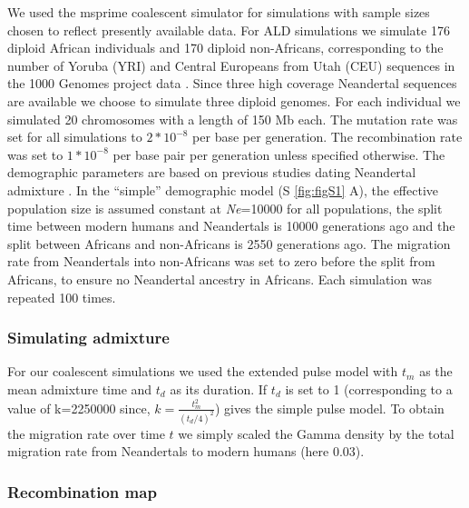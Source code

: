 \documentclass[]{article}
\begin{document}
We used the msprime coalescent simulator
\citep{kelleher_efficient_2016} for simulations with sample sizes
chosen to reflect presently available data. For ALD simulations we simulate 176 diploid
African individuals and 170 diploid non-Africans, corresponding to the
number of Yoruba (YRI) and Central Europeans from Utah (CEU)
sequences in the 1000 Genomes project data \citep{the_1000_genomes_project_consortium_global_2015}. Since three
high coverage Neandertal sequences are available \citep{prufer_complete_2013,prufer_high-coverage_2017,mafessoni_high_coverage_2020} we choose to
simulate three diploid genomes. For each individual we simulated 20
chromosomes with a length of 150 Mb each. The mutation rate was set for
all simulations to \(2*10^{-8}\) per base per generation. The
recombination rate was set to \(1*10^{-8}\) per base pair per generation
unless specified otherwise. The demographic parameters are based on
previous studies dating Neandertal admixture
\citep{sankararaman_date_2012,fu_genome_2014,moorjani_genetic_2016}. In
the ``simple'' demographic model (S \ref{fig:figS1} A), the effective
population size is assumed constant at \textit{Ne}=10000 for all populations, the
split time between modern humans and Neandertals is 10000 generations
ago and the split between Africans and non-Africans is 2550
generations ago. The migration rate from Neandertals into non-Africans
was set to zero before the split from Africans, to ensure no Neandertal
ancestry in Africans. Each simulation was repeated 100 times. 


\subsubsection{Simulating admixture}\label{Simulating the expanded pulse}

For our coalescent simulations we used the extended pulse model with $t_m$ as the mean admixture time and $t_d$ as its duration. If $t_d$ is set to 1 (corresponding to a value of k=2250000 since, $k=\frac{t_m^2}{(t_d/4)^2}$) gives the simple pulse model. To obtain the migration rate over time $t$ we simply scaled the Gamma density by the total migration rate from Neandertals to modern humans (here 0.03). 

\subsubsection{Recombination map}\label{recombination map}
\end{document}

